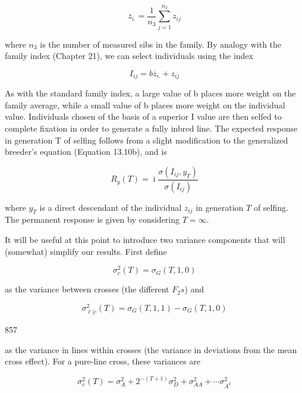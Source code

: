\documentclass{article}
\begin{document}
\begin{equation}
\overline{z}_{i.}=\frac{1}{n_{3}}\sum_{j=1}^{n_{3}}z_{ij}
\end{equation}

where  $ n_{3} $ is the number of measured sibs in the family. By analogy with the family index (Chapter 21), we can select individuals using the index

\begin{equation}
I_{ij}=b\overline{z}_{i.}+z_{ij}
\tag{23.44}
\label{eq:23_44}
\end{equation}

As with the standard family index, a large value of b places more weight on the family average, while a small value of b places more weight on the individual value. Individuals chosen of the basis of a superior I value are then selfed to complete fixation in order to generate a fully inbred line. The expected response in generation T of selfing follows from a slight modification to the generalized breeder's equation (Equation 13.10b), and is

\begin{equation}
R_{y}(T)=\bar{\imath}\frac{\sigma(I_{ij},y_{T})}{\sigma(I_{ij})}
\tag{23.45}
\label{eq:23_45}
\end{equation}

where  $ y_T $ is a direct descendant of the individual  $ z_{ij} $ in generation  $ T $ of selfing. The permanent response is given by considering  $ T = \infty $.

It will be useful at this point to introduce two variance components that will (somewhat) simplify our results. First define

\begin{equation}
\sigma_{c}^{2}(T)=\sigma_{G}(T,1,0)
\tag{23.46a}
\label{eq:23_46a}
\end{equation}

as the variance between crosses (the different  $ F_{2}s $) and

\begin{equation}
\sigma_{\ell|c}^{2}(T)=\sigma_{G}(T,1,1)-\sigma_{G}(T,1,0)
\tag{23.46b}
\label{eq:23_46b}
\end{equation}

857

as the variance in lines within crosses (the variance in deviations from the mean cross effect). For a pure-line cross, these variances are

\begin{equation}
\sigma_{c}^{2}(T)=\sigma_{A}^{2}+2^{-(T+1)}\sigma_{D}^{2}+\sigma_{A A}^{2}+\cdots\sigma_{A^{k}}^{2}
\tag{23.47a}
\label{eq:23_47a}
\end{equation}
\end{document}
